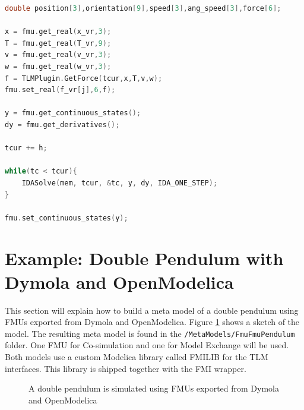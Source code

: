 \begin{lstlisting}[language=c++, basicstyle=\ttfamily\small,floatplacement=h,caption=Pseudo code for the simulation loop with FMI for model exchange,label=lst:wrapper_me]
double position[3],orientation[9],speed[3],ang_speed[3],force[6];

x = fmu.get_real(x_vr,3);
T = fmu.get_real(T_vr,9);
v = fmu.get_real(v_vr,3);
w = fmu.get_real(w_vr,3);
f = TLMPlugin.GetForce(tcur,x,T,v,w);
fmu.set_real(f_vr[j],6,f);

y = fmu.get_continuous_states();
dy = fmu.get_derivatives();

tcur += h;

while(tc < tcur){
    IDASolve(mem, tcur, &tc, y, dy, IDA_ONE_STEP);
}

fmu.set_continuous_states(y);
\end{lstlisting}

\clearpage
\section{Example: Double Pendulum with Dymola and OpenModelica}
This section will explain how to build a meta model of a double pendulum using FMUs exported from Dymola and OpenModelica.
Figure \ref{fig:double_pendulum} shows a sketch of the model.
The resulting meta model is found in the \texttt{/MetaModels/FmuFmuPendulum} folder.
One FMU for Co-simulation and one for Model Exchange will be used.
Both models use a custom Modelica library called FMILIB for the TLM interfaces.
This library is shipped together with the FMI wrapper.

\begin{figure}[ht]
\centering
{}
\caption{A double pendulum is simulated using FMUs exported from Dymola and OpenModelica}
\label{fig:double_pendulum}
\end{figure}

